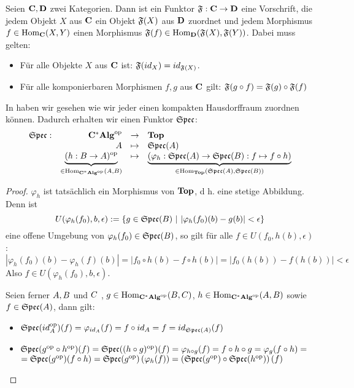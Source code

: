 \begin{defn}[Funktor]
Seien $\mathbf{C}, \mathbf{D}$ zwei Kategorien. Dann ist ein Funktor $\mathfrak{F}: \mathbf{C} \to \mathbf{D}$ eine Vorschrift, die jedem Objekt $X$ aus $\mathbf{C}$ ein Objekt $\mathfrak{F}(X)$ aus $\mathbf{D}$ zuordnet und jedem Morphismus $f \in \mathrm{Hom}_{\mathbf{C}}(X,Y)$ einen Morphismus $\mathfrak{F}(f) \in \mathrm{Hom}_{\mathbf{D}}(\mathfrak{F}(X), \mathfrak{F}(Y))$. Dabei muss gelten:
\begin{itemize}
	\item Für alle Objekte $X$ aus $\mathbf{C}$ ist: $\mathfrak{F}(id_X) = id_{\mathfrak{F}(X)}$.
	\item Für alle komponierbaren Morphismen $f, g$ aus $\mathbf{C}$ gilt: $\mathfrak{F}(g\circ f) = \mathfrak{F}(g)\circ \mathfrak{F}(f)$
\end{itemize}
\end{defn}

\begin{bsp}\label{bsp:FunktorSpec}
In  haben wir gesehen wie wir jeder \CAlg{} einen kompakten Hausdorffraum zuordnen können. Dadurch erhalten wir einen Funktor $\mathfrak{Spec}$:
\[ \begin{array}{@{}rrcl@{}}
	\SpecC: 	&\KatCAlg^\op		&\to 		&\KatTop													\\
				&\A					&\mapsto 	&\SpecC(\A)													\\				
				&\underbrace{(h:\B \to \A)^\op}_{\in \Hom_{\KatCAlg^\op}(\A,\B)} 	&\mapsto	
				&\underbrace{(\varphi_h: \SpecC(\A) \to \SpecC(\B): f \mapsto f \circ h)}_{\in \Hom_{\KatTop}(\SpecC(\A),\SpecC(\B))}
\end{array} \]
\end{bsp}

\begin{proof}$\varphi_h$ ist tatsächlich ein Morphismus von $\mathbf{Top}$, d h. eine stetige Abbildung. Denn ist 
	\[U(\varphi_h(f_0), b, \epsilon) := \{g \in \mathfrak{Spec}(B) ~|~ |\varphi_h(f_0)(b)-g(b)| < \epsilon\}\]
eine offene Umgebung von $\varphi_h(f_0) \in \mathfrak{Spec}(B)$, so gilt für alle $f \in U(f_0,h(b),\epsilon)$:
	\[\left|\varphi_h(f_0)(b)-\varphi_h(f)(b)\right| = \left|f_0\circ h(b) - f\circ h(b)\right| = \left|f_0(h(b))-f(h(b))\right| < \epsilon\]
Also $f \in U(\varphi_h(f_0), b, \epsilon)$.

Seien ferner $A, B$ und $C$ \CAlgn{}, $g \in \mathrm{Hom}_{\mathbf{C^*Alg}^{\mathrm{op}}}(B,C)$, $h \in \mathrm{Hom}_{\mathbf{C^*Alg}^{\mathrm{op}}}(A,B)$ sowie $f \in \mathfrak{Spec}(A)$, dann gilt:
\begin{itemize}
	\item $\mathfrak{Spec}(id_A^{\mathrm{op}})(f) = \varphi_{id_A}(f) = f \circ id_A = f =  id_{\mathfrak{Spec}(A)}(f)$
	\item $\mathfrak{Spec}(g^{\mathrm{op}} \circ h^{\mathrm{op}})(f) = \mathfrak{Spec}((h \circ g)^{\mathrm{op}})(f) = \varphi_{h \circ g}(f) = f \circ h \circ g = \varphi_g(f \circ h) =$ \newline $ = \mathfrak{Spec}(g^{\mathrm{op}})(f \circ h) = \mathfrak{Spec}(g^{\mathrm{op}})\left(\varphi_h(f)\right) = \left(\mathfrak{Spec}(g^{\mathrm{op}})\circ\mathfrak{Spec}(h^{\mathrm{op}})\right)(f)$
\end{itemize}
\end{proof}

